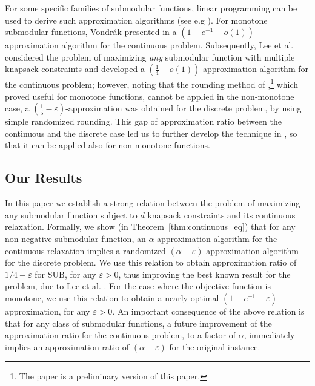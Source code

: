\documentclass[11pt]{article}
\newcommand{\eps}{\varepsilon}
\newcommand{\SUB}{\mbox{SUB}}
\begin{document}
{For some specific families of submodular functions,
linear programming can be used to derive such approximation algorithms
(see e.g  \cite{as04,ccpv07}). For monotone submodular functions,
Vondr\'{a}k presented in \cite{Vo08} a
$(1-e^{-1}-o(1))$-approximation algorithm for the continuous
problem. Subsequently,
Lee et al. \cite{LMNS09} considered the problem of maximizing {\em any}
submodular function with multiple knapsack constraints and developed
a $(\frac{1}{4}-o(1))$-approximation algorithm for the continuous
problem; however, noting that the rounding method of \cite{KST09},\footnote{
The paper \cite{KST09} is a preliminary version of this paper.}
which proved useful for monotone functions, cannot be applied in the non-monotone case,
a $(\frac{1}{5}-\eps)$-approximation was obtained for the discrete
problem, by using simple randomized rounding.
This gap of approximation ratio between the continuous and the
discrete case led us to further develop the technique in \cite{KST09},
so that it can be applied also for non-monotone functions.


\subsection{Our Results}
In this paper
we establish a strong relation
between the problem of maximizing any submodular function subject
to $d$ knapsack constraints and its continuous relaxation.
Formally, we show (in Theorem~\ref{thm:continuous_eq}) that for
any non-negative submodular function, an $\alpha$-approximation
algorithm for the continuous relaxation implies a randomized
$(\alpha - \eps)$-approximation algorithm for the discrete
problem. We use this relation to
obtain approximation ratio of $1/4- \eps$ for {\SUB}, for any
$\eps > 0$, thus improving the best known result for the problem,
due to Lee et al. \cite{LMNS09}. For the case where the objective
function is monotone, we use this relation to obtain a nearly
optimal $(1-e^{-1}-\eps)$ approximation, for any $\eps>0$. An
important consequence of the above relation is that for any
class of submodular functions,
a future improvement of the approximation ratio for the continuous
problem, to a factor of $\alpha$,
immediately implies an approximation ratio of $(\alpha -\eps)$ for
the original instance.

}
\end{document}
